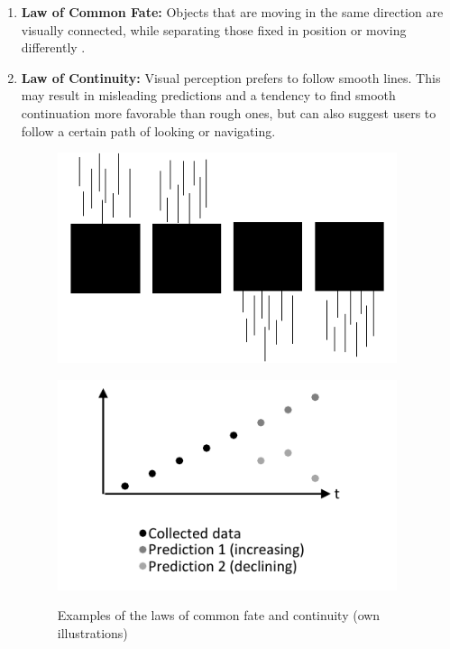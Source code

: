 \begin{enumerate}
    \item \textbf{Law of Common Fate:} Objects that are moving in the same direction are visually connected, while separating those fixed in position or moving differently \parencite{Todorovic.2008}.
    
    \item \textbf{Law of Continuity:} Visual perception prefers to follow smooth lines. This may result in misleading predictions and a tendency to find smooth continuation more favorable than rough ones, but can also suggest users to follow a certain path of looking or navigating. \parencites{Bakar.2017}{Todorovic.2008}
    
    \begin{figure}[H] 
        \begin{minipage}[b]{.5\linewidth}
            \centering\includegraphics[width=0.94\textwidth]{img/fate.pdf}
            \label{fig:fate}
        \end{minipage}%
        \begin{minipage}[b]{.5\linewidth}
            \centering\includegraphics[width=0.94\textwidth]{img/continuity.pdf}
            \label{fig:con}
        \end{minipage}
        \caption[Laws of Common Fate and Continuity]{Examples of the laws of common fate and continuity (own illustrations)}\label{fig:law3}
    \end{figure}
    

\end{enumerate}
